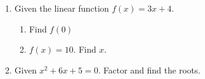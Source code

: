 \documentclass[12pt, twoside]{article}
\begin{document}
\begin{enumerate}
\item Given the linear function $f(x)=3x+4$.
\begin{multicols}{2}
  \begin{enumerate}
    \item Find $f(0)$ \vspace{6cm}
    \item   $f(x)=10$. Find $x$. \vspace{6cm}
  \end{enumerate}
\end{multicols}
  \vspace{6cm}

\item Given $x^2+6x+5=0$. Factor and find the roots. \vspace{4cm}

\end{enumerate}
\end{document}
